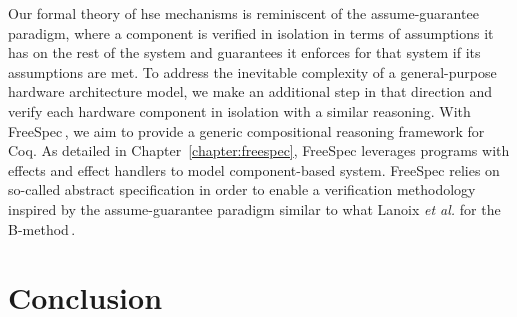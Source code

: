 Our formal theory of \ac{hse} mechanisms is reminiscent of the
assume-guarantee paradigm, where a component is verified in isolation in terms
of assumptions it has on the rest of the system and guarantees it enforces for
that system if its assumptions are met.
%
To address the inevitable complexity of a general-purpose hardware architecture
model, we make an additional step in that direction and verify each hardware
component in isolation with a similar reasoning.
%
With FreeSpec\,\cite{letan2018freespeccode}, we aim to provide a generic
compositional reasoning framework for Coq.
%
As detailed in Chapter~\ref{chapter:freespec}, FreeSpec leverages programs with
effects and effect handlers to model component-based system.
%
FreeSpec relies on so-called abstract specification in order to enable a
verification methodology inspired by the assume-guarantee paradigm similar to
what Lanoix \emph{et al.} for the B-method\,\cite{lanoix:hal-00105041}.

\section{Conclusion}
\label{sec:sota:conclusion}

